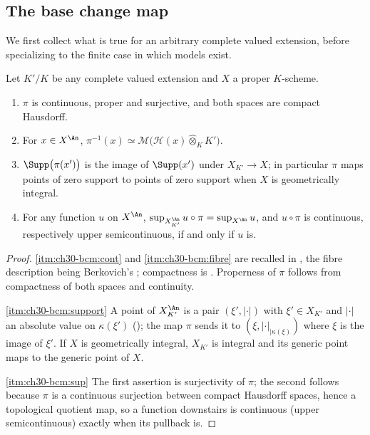 \subsection{The base change map}
\label{sec:ch30-bc-map}

We first collect what is true for an arbitrary complete valued extension,
before specializing to the finite case in which models exist.

\begin{lemma}
\label{lem:ch30-base-change-map}
Let \(K'/K\) be any complete valued extension and \(X\) a proper
\(K\)-scheme.
\begin{enumerate}
\item\label{itm:ch30-bcm:cont}
\(\pi\) is continuous, proper and surjective, and both spaces are compact
Hausdorff.
\item\label{itm:ch30-bcm:fibre}
For \(x\in X^{\An}\),
\(\pi^{-1}(x)\simeq\mathcal M\bigl(\mathcal H(x)\widehat\otimes_KK'\bigr)\).
\item\label{itm:ch30-bcm:support}
\(\Supp\bigl(\pi(x')\bigr)\) is the image of \(\Supp(x')\) under
\(X_{K'}\to X\); in particular \(\pi\) maps points of zero support to points
of zero support when \(X\) is geometrically integral.
\item\label{itm:ch30-bcm:sup}
For any function \(u\) on \(X^{\An}\),
\(\sup_{X_{K'}^{\An}}u\circ\pi=\sup_{X^{\An}}u\), and \(u\circ\pi\) is
continuous, respectively upper semicontinuous, if and only if \(u\) is.
\end{enumerate}
\end{lemma}

\begin{proof}
\cref{itm:ch30-bcm:cont} and \cref{itm:ch30-bcm:fibre} are recalled in
, the fibre description being Berkovich's
\cite[\S1.4 and \S3.4]{Berk12}; compactness is
.  Properness of \(\pi\) follows from
compactness of both spaces and continuity.

\cref{itm:ch30-bcm:support}  A point of \(X_{K'}^{\An}\) is a pair
\((\xi',|\cdot|)\) with \(\xi'\in X_{K'}\) and \(|\cdot|\) an absolute value
on \(\kappa(\xi')\) (); the map \(\pi\)
sends it to \((\xi,|\cdot|_{|\kappa(\xi)})\) where \(\xi\) is the image of
\(\xi'\).  If \(X\) is geometrically integral, \(X_{K'}\) is integral and
its generic point maps to the generic point of \(X\).

\cref{itm:ch30-bcm:sup}  The first assertion is surjectivity of \(\pi\);
the second follows because \(\pi\) is a continuous surjection between
compact Hausdorff spaces, hence a topological quotient map, so a function
downstairs is continuous (upper semicontinuous) exactly when its pullback
is.
\end{proof}

